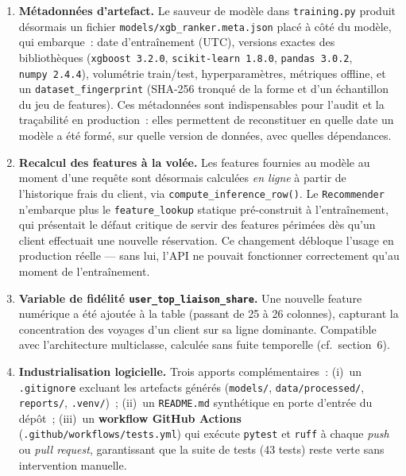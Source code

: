 \documentclass[11pt, a4paper]{article}
\begin{document}
\begin{enumerate}
\item \textbf{Métadonnées d'artefact.} Le sauveur de modèle dans
    \texttt{training.py} produit désormais un fichier
    \texttt{models/xgb\_ranker.meta.json} placé à côté du modèle, qui
    embarque~: date d'entraînement (UTC), versions exactes des
    bibliothèques (\texttt{xgboost~3.2.0}, \texttt{scikit-learn~1.8.0},
    \texttt{pandas~3.0.2}, \texttt{numpy~2.4.4}), volumétrie
    train/test, hyperparamètres, métriques offline, et un
    \texttt{dataset\_fingerprint} (SHA-256 tronqué de la forme et
    d'un échantillon du jeu de features). Ces métadonnées sont
    indispensables pour l'audit et la traçabilité en production~:
    elles permettent de reconstituer en quelle date un modèle a été
    formé, sur quelle version de données, avec quelles dépendances.

\item \textbf{Recalcul des features à la volée.} Les features
    fournies au modèle au moment d'une requête sont désormais calculées
    \textit{en ligne} à partir de l'historique frais du client, via
    \texttt{compute\_inference\_row()}. Le \texttt{Recommender}
    n'embarque plus le \texttt{feature\_lookup} statique pré-construit
    à l'entraînement, qui présentait le défaut critique de servir des
    features périmées dès qu'un client effectuait une nouvelle
    réservation. Ce changement débloque l'usage en production réelle
    --- sans lui, l'API ne pouvait fonctionner correctement qu'au
    moment de l'entraînement.

\item \textbf{Variable de fidélité \texttt{user\_top\_liaison\_share}.}
    Une nouvelle feature numérique a été ajoutée à la table
    (passant de 25 à 26 colonnes), capturant la concentration des
    voyages d'un client sur sa ligne dominante. Compatible avec
    l'architecture multiclasse, calculée sans fuite temporelle
    (cf.~section~6).

\item \textbf{Industrialisation logicielle.} Trois apports
    complémentaires~:
    (i)~un \texttt{.gitignore} excluant les artefacts générés
    (\texttt{models/}, \texttt{data/processed/}, \texttt{reports/},
    \texttt{.venv/})~;
    (ii)~un \texttt{README.md} synthétique en porte d'entrée du dépôt~;
    (iii)~un \textbf{workflow GitHub Actions}
    (\texttt{.github/workflows/tests.yml}) qui exécute
    \texttt{pytest} et \texttt{ruff} à chaque \textit{push} ou
    \textit{pull request}, garantissant que la suite de tests
    (43 tests) reste verte sans intervention manuelle.
\end{enumerate}
\end{document}
